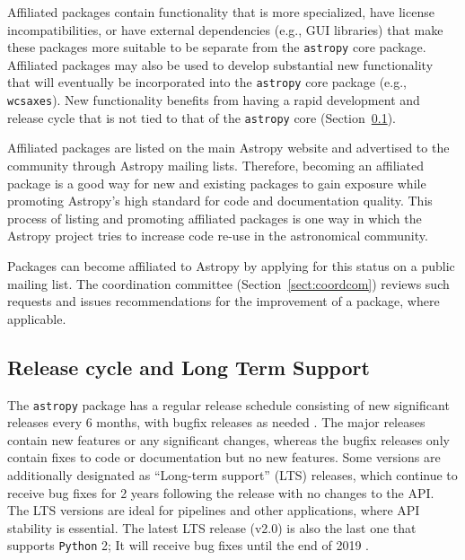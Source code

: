 \documentclass[modern]{aastex61}
\newcommand{\package}[1]{\texttt{#1}\xspace}
\newcommand{\python}{\package{Python}}
\newcommand{\astropy}{Astropy\xspace}
\newcommand{\astropypkg}{\package{astropy}}
\newcommand{\sectionname}{Section\xspace}
\begin{document}
Affiliated packages contain functionality that is more specialized,
have license incompatibilities, or have external dependencies (e.g., GUI
libraries) that make these packages more suitable to be separate from the
\astropypkg core package.
Affiliated packages may also be used to develop substantial new functionality
that will eventually be incorporated into the \astropypkg core package
(e.g., \texttt{wcsaxes}).
New functionality benefits from having a rapid development and release cycle that is not tied to that of the \astropypkg core (\sectionname~\ref{sect:releasecycle}).

Affiliated packages are listed on the main \astropy website and advertised to the community through \astropy mailing lists. Therefore, becoming an affiliated package is a good way for new and existing packages to gain exposure while promoting \astropy's high standard for code and documentation quality. This process of listing and promoting affiliated packages is one way in which the \astropy project tries to increase code re-use in the astronomical community.

Packages can become affiliated to \astropy by applying for this status on a public mailing list. The coordination committee (\sectionname~\ref{sect:coordcom}) reviews such requests and issues recommendations for the improvement of a package, where applicable.


\subsection{Release cycle and Long Term Support}
\label{sect:releasecycle}

The \astropypkg package has a regular release schedule consisting of new significant
releases every 6 months, with bugfix releases as needed \citep{ape2}.
The major releases contain new features or any significant changes, whereas
the bugfix releases only contain fixes to code or documentation but no new
features.
Some versions are additionally designated as ``Long-term support'' (LTS)
releases, which continue to receive bug fixes for 2 years following the release
with no changes to the API\@.
The LTS versions are ideal for pipelines and other applications, where API
stability is essential.
The latest LTS release (v2.0) is also the last one that supports \python 2; It
will receive bug fixes until the end of 2019 \citep{ape10}.
\end{document}
